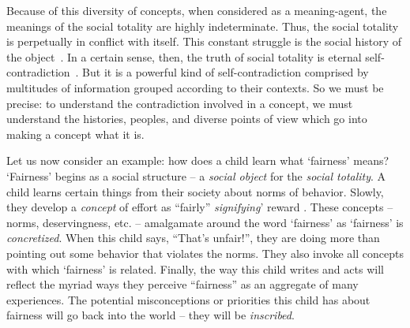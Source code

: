 
Because of this diversity of concepts, when considered as a meaning-agent, the meanings of the social totality are highly indeterminate. Thus, the social totality is perpetually in conflict with itself. This constant struggle is the social history of the object~\citep{foucault2002order}. In a certain sense, then, the truth of social totality is eternal self-contradiction~\citep{Hegel:PhG}. But it is a powerful kind of self-contradiction comprised by multitudes of information grouped according to their contexts. So we must be precise: to understand the contradiction involved in a concept, we must understand the histories, peoples, and diverse points of view which go into making a concept what it is. 

Let us now consider an example: how does a child learn what `fairness' means? `Fairness' begins as a social structure -- a \textit{social object} for the \textit{social totality}. A child learns certain things from their society about norms of behavior.
Slowly, they develop a \textit{concept} of effort as ``fairly'' \textit{signifying}' reward \citep{Rawls:TheoryJustice}. These concepts -- norms, deservingness, etc. -- amalgamate around the word `fairness' as `fairness' is \textit{concretized}. When this child says, ``That's unfair!'', they are doing more than pointing out some behavior that violates the norms. They also invoke all concepts with which `fairness' is related. Finally, the way this child writes and acts will reflect the myriad ways they perceive ``fairness'' as an aggregate of many experiences. The potential misconceptions or priorities this child has about fairness will go back into the world -- they will be \textit{inscribed}.

